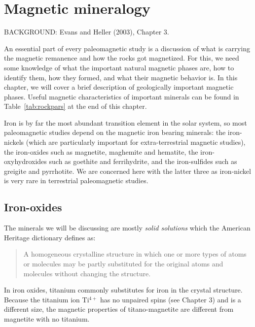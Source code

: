 \chapter{Magnetic mineralogy}


\noindent
BACKGROUND: Evans and Heller (2003), Chapter 3.  \nocite{evans03}
\vskip 24pt

An essential part of every paleomagnetic study is a discussion of what is
carrying the magnetic remanence and how the rocks got magnetized.  For this, we
need some knowledge of what the important natural magnetic phases are, how to
identify them,  how they formed, and what their magnetic behavior is. 
In this chapter, we will  cover a brief description of geologically important magnetic
phases. Useful magnetic characteristics of important minerals
can be found in Table~\ref{tab:rockpars} at the end of this chapter.

Iron is by far the most abundant transition element in the solar system, so most
paleomagnetic studies depend on the magnetic iron bearing minerals: the iron-nickels
(which are particularly important for extra-terrestrial magnetic studies), the 
iron-oxides such as magnetite, maghemite  and hematite, the  iron-oxyhydroxides such as goethite and ferrihydrite, and the iron-sulfides such as greigite and pyrrhotite. 
 We are concerned here with the latter three as iron-nickel is very rare in terrestrial paleomagnetic studies.  

 
 
 \section {Iron-oxides}
 
 The minerals we will be discussing are mostly
{\it solid solutions} which the American Heritage dictionary defines  as:
 
 \begin{quote}
A homogeneous crystalline structure in which one or more types of atoms or molecules may be partly substituted for the original atoms and molecules without changing the structure.
\end{quote}

In  iron oxides, titanium commonly substitutes for iron in the crystal structure.  Because the titanium ion Ti$^{4+}$ has no unpaired spins (see Chapter 3) and is a different size, the magnetic properties of titano-magnetite are different from magnetite with no titanium.   




